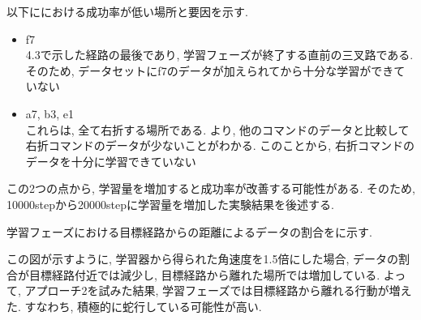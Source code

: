   以下ににおける成功率が低い場所と要因を示す.
  \begin{itemize}
    \item f7\\
    4.3で示した経路の最後であり, 学習フェーズが終了する直前の三叉路である. そのため, データセットにf7のデータが加えられてから十分な学習ができていない
    \item a7, b3, e1\\
    これらは, 全て右折する場所である. より, 他のコマンドのデータと比較して右折コマンドのデータが少ないことがわかる. このことから, 右折コマンドのデータを十分に学習できていない
  \end{itemize} 

  この2つの点から, 学習量を増加すると成功率が改善する可能性がある. そのため, 10000stepから20000stepに学習量を増加した実験結果を後述する.

  \newpage


  学習フェーズにおける目標経路からの距離によるデータの割合をに示す. \par
  この図が示すように, 学習器から得られた角速度を1.5倍にした場合, データの割合が目標経路付近では減少し, 目標経路から離れた場所では増加している. よって, アプローチ2を試みた結果, 学習フェーズでは目標経路から離れる行動が増えた. すなわち, 積極的に蛇行している可能性が高い.


